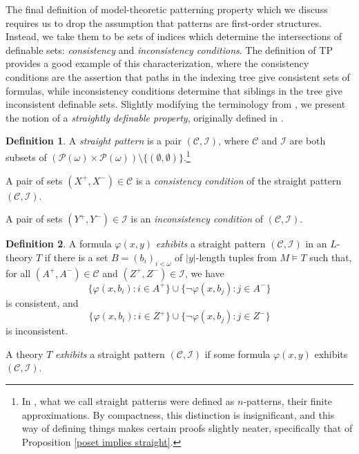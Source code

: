 \documentclass{article}
\newcommand{\calP}{\mathcal{P}}
\newcommand{\calC}{\mathcal{C}}
\newcommand{\calI}{\mathcal{I}}
\newcommand{\vphi}{\varphi}
\theoremstyle{definition}
\newtheorem{definition}{Definition}
\theoremstyle{definition}
\theoremstyle{definition}
\begin{document}
The final  definition of model-theoretic patterning property which we discuss requires us to drop the assumption that patterns are first-order structures. Instead, we take them to be sets of indices which determine the intersections of definable sets: \textit{consistency} and \textit{inconsistency conditions}. The definition of TP provides a good example of this characterization, where the consistency conditions are the assertion that paths in the indexing tree give consistent sets of formulas, while inconsistency conditions determine that siblings in the tree give inconsistent definable sets. Slightly modifying the terminology from \cite{bailetti2024walk}, we present the notion of a \textit{straightly definable property}, originally defined in \cite{shelah_what_2000}. %

\begin{definition}\label{straight pattern definition}
     A \textit{straight pattern} is a pair $(\calC,\calI)$, where $\calC$ and $\calI$ are both subsets of $(\calP(\omega)\times\calP(\omega))\setminus\{(\emptyset,\emptyset)\}$.\footnote{In \cite{bailetti2024walk}, what we call straight patterns were defined as $n$-patterns, their finite approximations. By compactness, this distinction is insignificant, and this way of defining things makes certain proofs slightly neater, specifically that of Proposition \ref{poset implies straight}.}

    A pair of sets $(X^+,X^-)\in \calC$ is a \textit{consistency condition} of the straight pattern $(\calC,\calI)$. 
    
    A pair of sets $(Y^+,Y^-)\in \calI$ is an \textit{inconsistency condition} of $(\calC,\calI)$.
    \end{definition}

\begin{definition}\label{exhibiting a straight pattern}
    A formula $\vphi(x,y)$ \textit{exhibits} a straight pattern $(\calC,\calI)$ in an $L$-theory $T$ if there is a set $B=(b_i)_{i<\omega}$ of $|y|$-length tuples from $M\models T$ such that, for all $(A^+,A^-)\in \calC$ and $(Z^+,Z^-)\in \calI$, we have 
    \[\{\vphi(x,b_i)\colon i\in A^+\}\cup \{\neg\vphi(x,b_j)\colon j\in A^-\}\] is consistent, and \[\{\vphi(x,b_i)\colon i\in Z^+\}\cup \{\neg\vphi(x,b_j)\colon j\in Z^-\}\] is inconsistent.

    A theory $T$ \textit{exhibits} a straight pattern $(\mathcal{C}, \mathcal{I})$ if some formula $\varphi(x, y)$ exhibits $(\mathcal{C}, \mathcal{I})$.
\end{definition}
\end{document}
